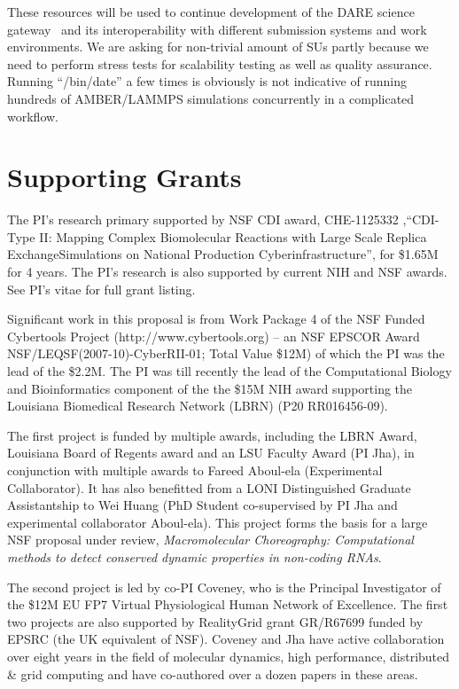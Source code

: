\documentclass[a4paper,10pt]{article}
\begin{document}
These resources will be used to continue development of the DARE science gateway~\cite{DARE} and its interoperability with different submission systems and work environments. We are asking for non-trivial amount of SUs partly because we need to perform stress tests for scalability testing as well as quality assurance. Running ``/bin/date'' a few times is obviously is not indicative of running hundreds of AMBER/LAMMPS simulations concurrently in a complicated workflow.

\section{Supporting Grants}

The PI's research primary supported by NSF CDI award, CHE-1125332
,``CDI-Type II: Mapping Complex Biomolecular Reactions with Large
Scale Replica ExchangeSimulations on National Production
Cyberinfrastructure'', for \$1.65M for 4 years. The PI's research is
also supported by current NIH and NSF awards.  See PI's vitae for full
grant listing.

Significant work in this proposal is from Work Package 4 of the NSF Funded Cybertools Project (http://www.cybertools.org) -- an NSF EPSCOR Award NSF/LEQSF(2007-10)-CyberRII-01; Total Value \$12M) of which the PI was the lead of the \$2.2M. The PI was till recently the lead of the Computational Biology and Bioinformatics component of the the \$15M NIH award supporting the Louisiana Biomedical Research Network (LBRN) (P20 RR016456-09). %

The first project is funded by multiple awards, including the LBRN Award, Louisiana Board of Regents award and an LSU Faculty Award (PI Jha), in conjunction with multiple awards to Fareed Aboul-ela (Experimental Collaborator). It has also benefitted from a LONI Distinguished Graduate Assistantship to Wei Huang (PhD Student co-supervised by PI Jha and experimental collaborator Aboul-ela). This project forms the basis for a large NSF proposal under review, {\it Macromolecular Choreography: Computational methods to detect conserved dynamic properties in non-coding RNAs}.

The second project is led by co-PI Coveney, who is the Principal Investigator of the \$12M EU FP7 Virtual Physiological Human Network of Excellence. The first two projects are also supported by RealityGrid grant GR/R67699 funded by EPSRC (the UK equivalent of NSF). Coveney and Jha have active collaboration over eight years in the field of molecular dynamics, high performance, distributed \& grid computing and have co-authored over a dozen papers in these areas.
 
\end{document}
